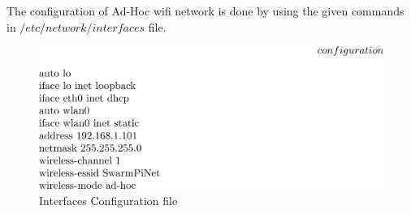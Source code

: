 The configuration of Ad-Hoc wifi network is done by using the given commands in $/etc/network/interfaces$ file.

\begin{figure}[h]
    \centering
    \includegraphics[width = 0.7\linewidth, trim = 0 0 1000 0,clip]{image/config.png}
    \caption{Interfaces Configuration file}
    \label{fig:my_label}
\end{figure}